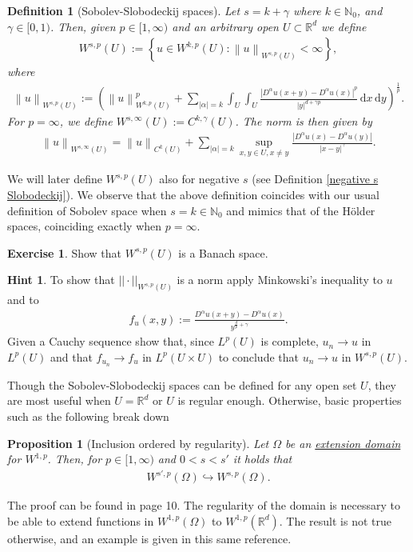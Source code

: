 \documentclass[
    a4paper,
    DIV=14,
    abstract=true,
    numbers=noenddot
]
{scrartcl}
\newtheorem{proposition}[theorem]{Proposition}
\newtheorem{definition}[theorem]{Definition}
\theoremstyle{definition}
\newtheorem{exercise}{Exercise}
\newtheorem*{hint}{Hint}
\newcommand{\set}[1]{\left\{#1\right\}}
\renewcommand{\norm}[1]{\left\lVert #1 \right\rVert}\renewcommand{\abs}[1]{\left| #1 \right|}
\renewcommand{\d}{\,\mathrm{d}}\newcommand{\dx}{\,\mathrm{d}x}
\newcommand{\N}{\mathbb{N}}
\newcommand{\R}{\mathbb{R}}
\begin{document}
\begin{definition}[Sobolev-Slobodeckij spaces]\label{soledkij def}
    Let $s=k+\gamma$ where $k \in \N_0$, and $\gamma \in [0,1)$. Then, given  $p \in [1,\infty)$ and an arbitrary open $U \subset \R^d$ we define
    \begin{align*}
        W^{s ,p}(U):= \set{u \in W^{k ,p}(U): \norm{u}_{W^{s,p}(U)}<\infty},
    \end{align*}
    where
    \begin{align}\label{norm def}
        \norm{u}_{W^{s,p}(U)}:= \left(\norm{u}_{W^{k,p}(U)}^p+ \sum_{\abs{\alpha}=k }\int_{U}\int_{U}\frac{\abs{D^\alpha u(x+y)-D^\alpha u(x)}^p}{\abs{y}^{d+\gamma p}}\d x \d y\right)^\frac{1}{p}.
    \end{align}
    For $p = \infty$, we define $W^{s,\infty}(U):= C^{k,\gamma}(U)$. The norm is then given by
    \begin{align*}
        \norm{u}_{W^{s,\infty}(U)}= \norm{u}_{C^{k}(U)}+ \sum_{\abs{\alpha} =k}  \sup _{x, y \in U, x \neq y} \frac{|D^\alpha u(x)- D^\alpha u(y)|}{|x-y|^\gamma }.
    \end{align*}
\end{definition}
We will later define $W^{s,p}(U)$ also for negative $s$ (see Definition \ref{negative s Slobodeckij}). We observe that the above definition coincides with our usual definition of Sobolev space when $s=k \in \N_0$ and mimics that of the H\"older spaces, coinciding exactly when $p=\infty$.
\begin{exercise}
    Show that $W^{s,p}(U)$ is a Banach space.
\end{exercise}
\begin{hint}
    To show that $|| \cdot ||_{W^{s,p}(U)}$ is a norm apply Minkowski's inequality to $u$ and to
    \begin{align*}
        f_u(x,y):=\frac{D^\alpha u(x+y)-D^\alpha u(x)}{y^{\frac{d}{p}+\gamma}}.
    \end{align*}
    Given a Cauchy sequence show that, since $L^p(U)$ is complete, $u_n \to u$ in $L^p(U)$ and that $f_{u_n} \to f_u$ in $L^p(U\times U)$ to conclude that $u_n \to u$ in $W^{s,p}(U)$.
\end{hint}
Though the Sobolev-Slobodeckij spaces can be defined for any open set $U$, they are most useful when $U=\R^d$ or $U$  is regular enough. Otherwise, basic properties such as the following break down
\begin{proposition}[Inclusion ordered by regularity]\label{inclusion ordered by regularity}
    Let  $\Omega$ be an \href{https://nowheredifferentiable.com/2023-07-12-PDEs-3-Sobolev_spaces/#:~:text=extend%20Sobolev%20functions}{extension domain} for $W^{1,p}$.  Then, for $p \in [1,\infty)$ and $0<s<s'$ it holds that
    \begin{align*}
        W^{s',p}(\Omega )\hookrightarrow W^{s,p}(\Omega ).
    \end{align*}
\end{proposition}
The proof can be found in \cite{di2012hitchhiker's} page 10. The regularity of the domain is necessary to be able to extend functions in $W^{1,p}(\Omega )$ to $W^{1,p}(\R^d)$. The result is not true otherwise, and an example is given in this same reference.
\end{document}
